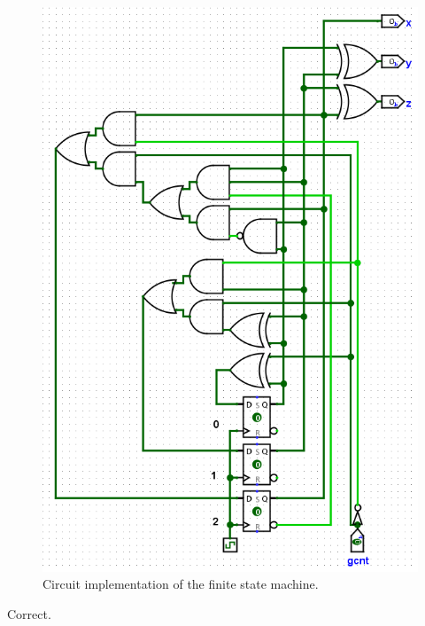 \documentclass{article}
\begin{document}
\begin{figure}[H]
    \centering
    \includegraphics[width=\textwidth]{./images/3_43_circ.png}
    \caption*{Circuit implementation of the finite state machine.}
\end{figure}
\textcolor{mygreen}{Correct.}
\end{document}
